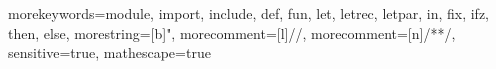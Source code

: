  {
	morekeywords={module, import, include, def, fun, let, letrec, letpar, in, fix,
	ifz, then, else}, morestring=[b]",
	morecomment=[l]{//},
	morecomment=[n]{/*}{*/},
  sensitive=true,
  mathescape=true
}


\newcommand{\pcfmcode}[1]{\lstinline[language=PCFM,basicstyle=\lstinlinestyle,breaklines=false]!#1!}
\newcommand{\pcfmcodefig}[1]{\lstinline[language=PCFM,basicstyle=\lstfigurestyle,breaklines=false]!#1!}
\newcommand{\pcfmcodebl}[1]{\lstinline[language=PCFM,basicstyle=\lstinlinestyle,breaklines=true]!#1!}
\newcommand{\PCFM}{\langname{PCFM}}
\newcommand{\pcfmcodemm}[1]{\lstinline[language=PCFM,basicstyle={\fontfamily{pcr}\fontsize{9pt}{11pt}\selectfont},breaklines=true]!#1!}

